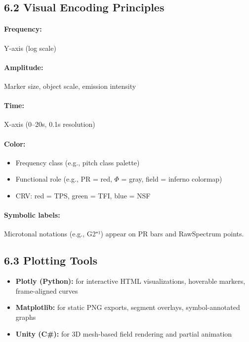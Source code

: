 \subsection*{6.2 Visual Encoding Principles}

\paragraph{Frequency:} Y-axis (log scale)  
\paragraph{Amplitude:} Marker size, object scale, emission intensity  
\paragraph{Time:} X-axis (0–20s, 0.1s resolution)  
\paragraph{Color:}  
\begin{itemize}
  \item Frequency class (e.g., pitch class palette)
  \item Functional role (e.g., PR = red, $\Phi$ = gray, field = inferno colormap)
  \item CRV: red = TPS, green = TFI, blue = NSF
\end{itemize}

\paragraph{Symbolic labels:} Microtonal notations (e.g., G2⁺¹) appear on PR bars and RawSpectrum points.

\subsection*{6.3 Plotting Tools}

\begin{itemize}
    \item \textbf{Plotly (Python):} for interactive HTML visualizations, hoverable markers, frame-aligned curves
    \item \textbf{Matplotlib:} for static PNG exports, segment overlays, symbol-annotated graphs
    \item \textbf{Unity (C\#):} for 3D mesh-based field rendering and partial animation
\end{itemize}

